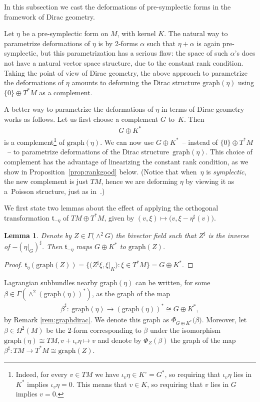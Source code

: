 \documentclass[10pt,a4paper]{amsart}
\numberwithin{equation}{section}
\newtheorem{Lemma}[Theorem]{Lemma}
\renewcommand{\t}{\mathfrak{t}}
\begin{document}
In this subsection we cast the deformations of pre-symplectic forms in the framework of Dirac geometry.

Let $\eta$ be a pre-symplectic form on $M$, with kernel $K$. The natural way to parametrize deformations of $\eta$ is by 2-forms $\alpha$ such that $\eta+\alpha$ is again pre-symplectic, but this parametrization has a serious flaw: the space of such $\alpha$'s does not have a natural vector space structure, due to the constant rank condition. Taking the point of view of Dirac geometry, the above approach to parametrize the deformations of $\eta$ amounts to deforming the Dirac structure $\mathrm{graph}(\eta)$ using $\{0\}\oplus T^*M$ as a complement.

A better way to parametrize the deformations of $\eta$ in terms of Dirac geometry works as follows. Let us first choose a complement $G$ to~$K$. Then
\begin{gather*}G\oplus K^*\end{gather*} is a complement\footnote{Indeed, for every $v\in TM$ we have $\iota_v \eta \in K^{\circ}=G^*$, so requiring that $\iota_v \eta $ lies in $K^*$ implies $\iota_v \eta=0$. This means that $v\in K$, so requiring that $v$ lies in $G$ implies $v=0$.} of $\mathrm{graph}(\eta)$. We can now use $G\oplus K^*$~-- instead of $\{0\}\oplus T^*M$~-- to parametrize deformations of the Dirac structure~$\mathrm{graph}(\eta)$. This choice of complement has the advantage of linearizing the constant rank condition, as we show in Proposition~\ref{prop:rankgood} below. (Notice that when~$\eta$ is {\em symplectic}, the new complement is just $TM$, hence we are deforming $\eta$ by viewing it as a~Poisson structure, just as in~\cite[Section~1.3]{SZPre}.)

We first state two lemmas about the effect of applying the orthogonal transformation $\t_{-\eta}$ of $TM\oplus T^*M$, given by $(v,\xi) \mapsto \big(v,\xi - \eta^\sharp(v)\big)$.

\begin{Lemma}\label{lemma:teZ}Denote by $Z\in \Gamma\big({\wedge}^2 G\big)$ the bivector field such that $Z^{\sharp}$ is the inverse of $-(\eta|_G)^{\sharp}$. Then $\t_{-\eta}$ maps $G\oplus K^*$ to $\mathrm{graph}(Z)$.
\end{Lemma}
\begin{proof}$\t_\eta(\mathrm{graph}(Z))= \big\{\big( Z^\sharp\xi , \xi|_K \big)\colon \xi\in T^*M\big\}=G\oplus K^*$.\end{proof}

Lagrangian subbundles nearby $\mathrm{graph}(\eta)$ can be written, for some $\bar{\beta}\in \Gamma(\wedge^2(\mathrm{graph}(\eta))^*)$, as the graph of the map
\begin{gather*}\bar{\beta}^{\sharp}\colon \ \mathrm{graph}(\eta) \to (\mathrm{graph}(\eta))^*\cong G\oplus K^*,\end{gather*}
by Remark \ref{rem:graphdirac}. We denote this graph as $\Phi_{G\oplus K^*}\big(\bar{\beta}\big)$. Moreover, let $\beta\in \Omega^2(M)$ be the 2-form corresponding to $\bar{\beta}$ under the isomorphism $\mathrm{graph}(\eta)\cong TM, v+\iota_v\eta \mapsto v$ and denote by $\Phi_{Z}({\beta})$ the graph of the map $ \beta^{\sharp}\colon TM\to T^*M\cong \mathrm{graph}(Z)$.
\end{document}
